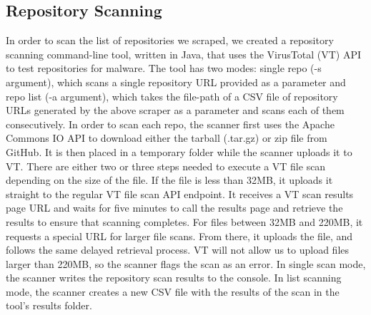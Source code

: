 \documentclass[]{acmart}
\begin{document}
\subsection{Repository Scanning}
In order to scan the list of repositories we scraped, we created a repository scanning command-line tool, written in Java, that uses the VirusTotal (VT) API to test repositories for malware. The tool has two modes: single repo (-s argument), which scans a single repository URL provided as a parameter and repo list (-a argument), which takes the file-path of a CSV file of repository URLs generated by the above scraper as a parameter and scans each of them consecutively. In order to scan each repo, the scanner first uses the Apache Commons IO API to download either the tarball (.tar.gz) or zip file from GitHub. It is then placed in a temporary folder while the scanner uploads it to VT. There are either two or three steps needed to execute a VT file scan depending on the size of the file. If the file is less than 32MB, it uploads it straight to the regular VT file scan API endpoint. It receives a VT scan results page URL and waits for five minutes to call the results page and retrieve the results to ensure that scanning completes. For files between 32MB and 220MB, it requests a special URL for larger file scans. From there, it uploads the file, and follows the same delayed retrieval process. VT will not allow us to upload files larger than 220MB, so the scanner flags the scan as an error. In single scan mode, the scanner writes the repository scan results to the console. In list scanning mode, the scanner creates a new CSV file with the results of the scan in the tool's results folder.
\end{document}
